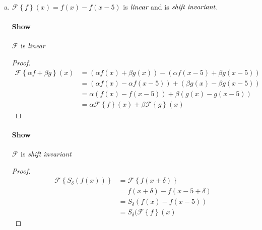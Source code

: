\documentclass{paper}
\begin{document}
\begin{enumerate}[(a)]
\paragraph{Show} $\mathcal{F}$ is not \emph{shift invariant} \\
\begin{proof}
\begin{align*}
    \mathcal{F} \left \{S_\delta (f(x)) \right\} 
    &= \mathcal{F} \left\{ f(x+\delta) \right\} \\
    &= x f(x+\delta) \\
    &\neq (x+\delta)f(x+\delta) \\
    &= S_{\delta} (x f(x)) \\ 
    &= S_\delta(\mathcal{F}\left \{f \right\}(x) 
\end{align*}
\end{proof}

\item $\mathcal{F} \left \{ f \right\} (x) = f(x) - f(x-5)$ is $\emph{linear}$ and is $\emph{shift invariant}$.

\paragraph{Show} $\mathcal{F}$ is \emph{linear} \\
\begin{proof}
\begin{align*}
    \mathcal{F} \left \{\alpha f + \beta g \right\}(x) 
    &= (\alpha f(x) + \beta g(x)) - (\alpha f(x-5) + \beta g(x-5)) \\
    &= (\alpha f(x) - \alpha f(x-5)) + (\beta g(x) - \beta g(x-5)) \\
    &= \alpha(f(x) - f(x-5)) + \beta(g(x) - g(x-5)) \\
    &= \alpha \mathcal{F} \left \{f\right\}(x) + \beta \mathcal{F} \left \{g \right\}(x)
\end{align*}
\end{proof}

\paragraph{Show} $\mathcal{F}$ is \emph{shift invariant} \\
\begin{proof}
\begin{align*}
    \mathcal{F} \left \{S_\delta (f(x)) \right\} 
    &= \mathcal{F} \left\{ f(x+\delta) \right\} \\
    &= f(x+\delta) - f(x -5 + \delta) \\
    &= S_{\delta} (f(x) - f(x-5)) \\
    &= S_\delta(\mathcal{F}\left \{f \right\}(x)
\end{align*}
\end{proof}


\end{enumerate}
\end{document}
